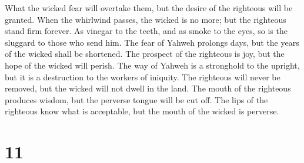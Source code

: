  What the wicked fear will overtake them, but the desire
of the righteous will be granted.  When the whirlwind
passes, the wicked is no more; but the righteous stand firm forever.
 As vinegar to the teeth, and as smoke to the eyes, so is
the sluggard to those who send him.  The fear of Yahweh
prolongs days, but the years of the wicked shall be shortened.
 The prospect of the righteous is joy, but the hope of
the wicked will perish.  The way of Yahweh is a
stronghold to the upright, but it is a destruction to the workers of
iniquity.  The righteous will never be removed, but the
wicked will not dwell in the land.  The mouth of the
righteous produces wisdom, but the perverse tongue will be cut off.
 The lips of the righteous know what is acceptable, but
the mouth of the wicked is perverse.

\hypertarget{section-10}{%
\section{11}\label{section-10}}

